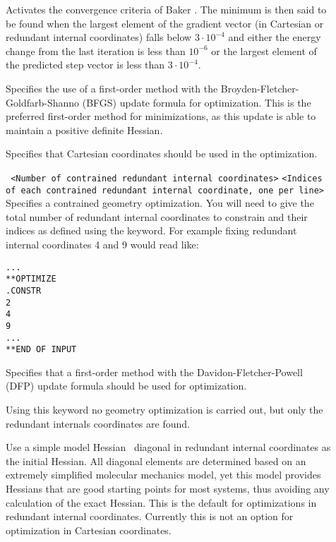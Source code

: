 \begin{description}

\item[]
Activates the convergence criteria of Baker \cite{Baker}. The minimum
is then said to be found when the largest element of the gradient
vector (in Cartesian or redundant internal coordinates) falls below
$3\cdot 10^{-4}$ and either the energy change from the last
iteration is less than $10^{-6}$ or the largest element of
the predicted step vector is less than $3\cdot 10^{-4}$.

\item[]
Specifies the use of a first-order method
with the Broyden-Fletcher-Goldfarb-Shanno (BFGS)
update formula for optimization. This is the
preferred first-order method for minimizations, as this update is able
to maintain a positive definite Hessian.

\item[]
Specifies that Cartesian coordinates
should be used in the optimization.

\item[]\verb| | \newline
\verb|<Number of contrained redundant internal coordinates>|\newline
\verb|<Indices of each contrained redundant internal coordinate, one per line>|\newline
Specifies a contrained geometry optimization. You will need to give
the total number of redundant internal coordinates to constrain and their
indices as defined using the  keyword.
For example fixing redundant internal coordinates 4 and 9 would read like:
\begin{verbatim}
...
**OPTIMIZE
.CONSTR
2
4
9
...
**END OF INPUT
\end{verbatim}


\item[]
Specifies that a first-order method with the
Davidon-Fletcher-Powell (DFP) update formula should be used for optimization.

\item[]
Using this keyword no geometry optimization is carried out, but only the redundant internals coordinates are found.

\item[]
Use a simple model Hessian~\cite{ModelHess} diagonal in redundant
internal coordinates as the initial Hessian. All diagonal elements are
determined based on an extremely simplified molecular mechanics model,
yet this model provides Hessians that are good starting points for
most systems, thus avoiding any calculation of the exact Hessian. This
is the default for optimizations in redundant internal coordinates. Currently 
this is not an option for optimization in Cartesian coordinates.


\end{description}
